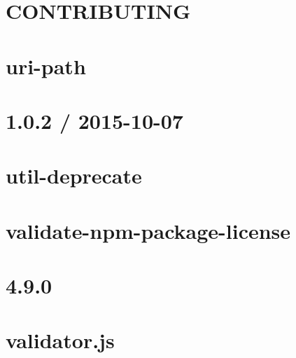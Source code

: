 \documentclass[twoside]{book}
\newcommand{\+}{\discretionary{\mbox{\scriptsize$\hookleftarrow$}}{}{}}
\begin{document}
\chapter{C\+O\+N\+T\+R\+I\+B\+U\+T\+I\+NG}
\label{md_app_web_node_modules_uri-path__c_o_n_t_r_i_b_u_t_i_n_g}

\chapter{uri-\/path}
\label{md_app_web_node_modules_uri-path__r_e_a_d_m_e}

\chapter{1.0.2 / 2015-\/10-\/07}
\label{md_app_web_node_modules_util-deprecate__history}

\chapter{util-\/deprecate}
\label{md_app_web_node_modules_util-deprecate__r_e_a_d_m_e}

\chapter{validate-\/npm-\/package-\/license}
\label{md_app_web_node_modules_validate-npm-package-license__r_e_a_d_m_e}

\chapter{4.9.0}
\label{md_app_web_node_modules_validator__c_h_a_n_g_e_l_o_g}

\chapter{validator.\+js}
\label{md_app_web_node_modules_validator__r_e_a_d_m_e}

\end{document}
